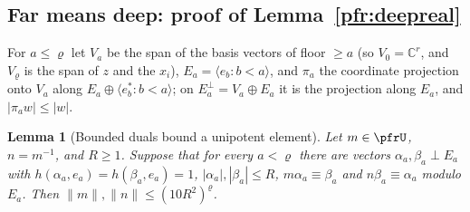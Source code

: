 \documentclass[10pt]{amsart}
\newtheorem{lemma}[theorem]{Lemma}
\theoremstyle{definition}
\theoremstyle{remark}
\newcommand{\C}{\mathbb C}
\begin{document}
\subsection{Far means deep: proof of Lemma~\ref{pfr:deepreal}}\label{prp:ss-deep}

For $a\le\varrho$ let $V_a$ be the span of the basis vectors of floor $\ge a$ (so $V_0=\C^r$, and $V_\varrho$ is the
span of $z$ and the $x_i$), $E_a=\langle e_b:b<a\rangle$, and $\pi_a$ the coordinate projection onto $V_a$ along
$E_a\oplus\langle e_b^*:b<a\rangle$; on $E_a^\perp=V_a\oplus E_a$ it is the projection along $E_a$, and
$|\pi_aw|\le|w|$.

\begin{lemma}[Bounded duals bound a unipotent element]\label{prp:unip}
Let $m\in\pfrU$, $n=m^{-1}$, and $R\ge1$. Suppose that for every $a<\varrho$ there are vectors
$\alpha_a,\beta_a\perp E_a$ with $h(\alpha_a,e_a)=h(\beta_a,e_a)=1$, $|\alpha_a|,|\beta_a|\le R$,
$m\alpha_a\equiv\beta_a$ and $n\beta_a\equiv\alpha_a$ modulo $E_a$. Then $\|m\|,\|n\|\le(10R^2)^\varrho$.
\end{lemma}
\end{document}
